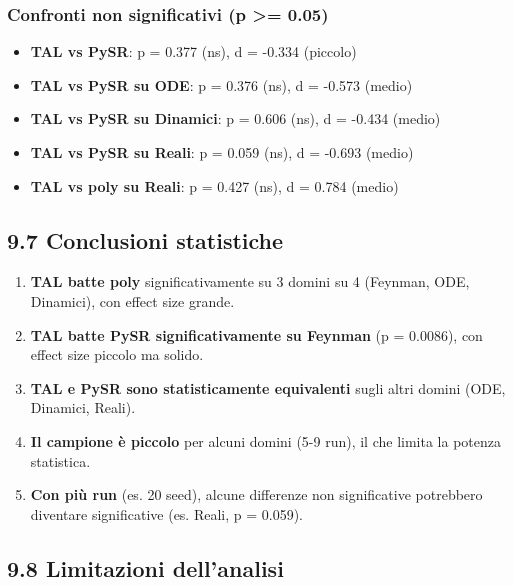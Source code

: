 \documentclass[
]{article}
\providecommand{\tightlist}{%
  \setlength{\itemsep}{0pt}\setlength{\parskip}{0pt}}
\begin{document}
\subsubsection{Confronti non significativi (p \textgreater=
0.05)}\label{confronti-non-significativi-p-0.05}

\begin{itemize}
\tightlist
\item
  \textbf{TAL vs PySR}: p = 0.377 (ns), d = -0.334 (piccolo)
\item
  \textbf{TAL vs PySR su ODE}: p = 0.376 (ns), d = -0.573 (medio)
\item
  \textbf{TAL vs PySR su Dinamici}: p = 0.606 (ns), d = -0.434 (medio)
\item
  \textbf{TAL vs PySR su Reali}: p = 0.059 (ns), d = -0.693 (medio)
\item
  \textbf{TAL vs poly su Reali}: p = 0.427 (ns), d = 0.784 (medio)
\end{itemize}

\subsection{9.7 Conclusioni statistiche}\label{conclusioni-statistiche}

\begin{enumerate}
\def\labelenumi{\arabic{enumi}.}
\tightlist
\item
  \textbf{TAL batte poly} significativamente su 3 domini su 4 (Feynman,
  ODE, Dinamici), con effect size grande.
\item
  \textbf{TAL batte PySR significativamente su Feynman} (p = 0.0086),
  con effect size piccolo ma solido.
\item
  \textbf{TAL e PySR sono statisticamente equivalenti} sugli altri
  domini (ODE, Dinamici, Reali).
\item
  \textbf{Il campione è piccolo} per alcuni domini (5-9 run), il che
  limita la potenza statistica.
\item
  \textbf{Con più run} (es. 20 seed), alcune differenze non
  significative potrebbero diventare significative (es. Reali, p =
  0.059).
\end{enumerate}

\subsection{9.8 Limitazioni dell'analisi}\label{limitazioni-dellanalisi}
\end{document}
